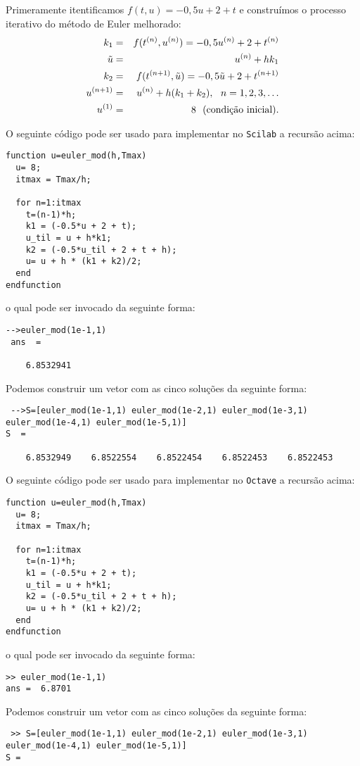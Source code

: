 \begin{resol} Primeramente itentificamos $f(t,u)=-0,5u+2+t$ e construímos o processo iterativo do método de Euler melhorado: 
\begin{eqnarray*}
  k_1&=&  f(t^{(n)},u^{(n)})=-0,5u^{(n)}+2+t^{(n)}\\
  \tilde{u}&=& u^{(n)} + hk_1\\
  k_2&=&  f(t^{(n+1)},\tilde{u})=-0,5\tilde{u}+2+t^{(n+1)}\\
  u^{(n+1)}&=&u^{(n)} + h( k_1+k_2),~~n=1,2,3,\ldots\\
  u^{(1)}&=&8 ~~ \hbox{(condição inicial)}.
\end{eqnarray*}

\ifisscilab
O seguinte código pode ser usado para implementar no \verb+Scilab+ a recursão acima:
\begin{verbatim}
function u=euler_mod(h,Tmax)
  u= 8;
  itmax = Tmax/h;

  for n=1:itmax
    t=(n-1)*h;
    k1 = (-0.5*u + 2 + t);
    u_til = u + h*k1;
    k2 = (-0.5*u_til + 2 + t + h);
    u= u + h * (k1 + k2)/2;
  end
endfunction
\end{verbatim}
o qual pode ser invocado da seguinte forma:
\begin{verbatim}
-->euler_mod(1e-1,1)
 ans  =
 
    6.8532941 
\end{verbatim}
Podemos construir um vetor com as cinco soluções da seguinte forma:
\begin{verbatim}
 -->S=[euler_mod(1e-1,1) euler_mod(1e-2,1) euler_mod(1e-3,1) euler_mod(1e-4,1) euler_mod(1e-5,1)]
S  =
 
    6.8532949    6.8522554    6.8522454    6.8522453    6.8522453 
 \end{verbatim}
\fi
\ifisoctave
O seguinte código pode ser usado para implementar no \verb+Octave+ a recursão acima:
\begin{verbatim}
function u=euler_mod(h,Tmax)
  u= 8;
  itmax = Tmax/h;

  for n=1:itmax
    t=(n-1)*h;
    k1 = (-0.5*u + 2 + t);
    u_til = u + h*k1;
    k2 = (-0.5*u_til + 2 + t + h);
    u= u + h * (k1 + k2)/2;
  end
endfunction
\end{verbatim}
o qual pode ser invocado da seguinte forma:
\begin{verbatim}
>> euler_mod(1e-1,1)
ans =  6.8701
\end{verbatim}
Podemos construir um vetor com as cinco soluções da seguinte forma:
\begin{verbatim}
 >> S=[euler_mod(1e-1,1) euler_mod(1e-2,1) euler_mod(1e-3,1) euler_mod(1e-4,1) euler_mod(1e-5,1)]
S =


\end{verbatim}
\end{resol}
